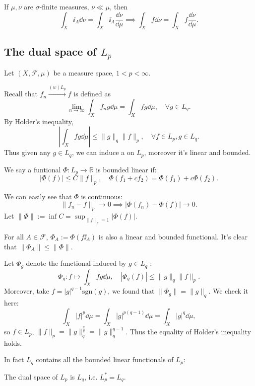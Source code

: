 \begin{remark}
    If $\mu, \nu$ are $\sigma$-finite measures,  $\nu \ll \mu$, then
	\[
	\int_X \ii_A \dd \nu = \int_X \ii_A \frac{\dd\nu}{\dd\mu}
	\implies \int_X f\dd\nu = \int_X f \frac{\dd\nu}{\dd\mu}.
	\]
\end{remark}

\subsection{The dual space of $L_p$}
\label{sub:The dual space of $L_p$}
Let $(X, \mathscr{F}, \mu)$ be a measure space, $1< p< \infty$.

Recall that $f_n \xrightarrow{(w)L_p} f$ is defined as
\[
\lim_{n\to \infty} \int_Xf_ng\dd\mu = \int_X fg\dd \mu, \quad \forall g\in L_q.
\]
By Holder's inequality,
\[
\left|\int_X fg\dd\mu\right| \le \lVert g \rVert _q \lVert f \rVert _p,
\quad \forall f\in L_p, g\in L_q.
\]
Thus given any $g\in L_q$, we can induce a  on $L_p$,
moreover it's linear and bounded.

\begin{definition}
	We say a funtional $\Phi: L_p \to \mathbb{R}$ is bounded linear if:
	\[
	|\Phi(f)| \le C\lVert f \rVert _p, \quad
	\Phi(f_1 + cf_2) = \Phi(f_1) + c\Phi(f_2).
	\]
\end{definition}
We can easily see that $\Phi$ is continuous:
\[
\lVert f_n - f \rVert _p \to 0 \implies |\Phi(f_n) - \Phi(f)| \to 0.
\]
Let $ \lVert \Phi \rVert := \inf C = \sup_{\lVert f \rVert _p = 1}|\Phi(f)|$.

For all $A\in \mathscr{F}$, $\Phi_A := \Phi(f\ii_A)$ is also
a linear and bounded functional.
It's clear that $ \lVert \Phi_A \rVert \le \lVert \Phi \rVert $.

Let $\Phi_g$ denote the functional induced by $g\in L_q$ :
\[
\Phi_g : f\mapsto \int_X fg\dd\mu,
\quad |\Phi_g(f)| \le \lVert g \rVert _q \lVert f \rVert _p.
\]
Moreover, take $f = |g|^{q-1}\mathrm{sgn}(g)$,
we found that $ \lVert \Phi_g \rVert = \lVert g \rVert _q$.
We check it here:
\[
\int_X |f|^p \dd\mu = \int_X |g|^{p(q-1)}\dd\mu = \int_X |g|^{q}\dd\mu,
\]
so $f\in L_p$, $ \lVert f \rVert _p = \lVert g \rVert _q^{\frac{q}{p}}
= \lVert g \rVert _q^{q-1}$.
Thus the equality of Holder's inequality holds.

In fact $L_q$ contains all the bounded linear functionals of $L_p$:
\begin{theorem}
    The dual space of $L_p$ is $L_q$, i.e. $L_p^* = L_q$.
\end{theorem}

